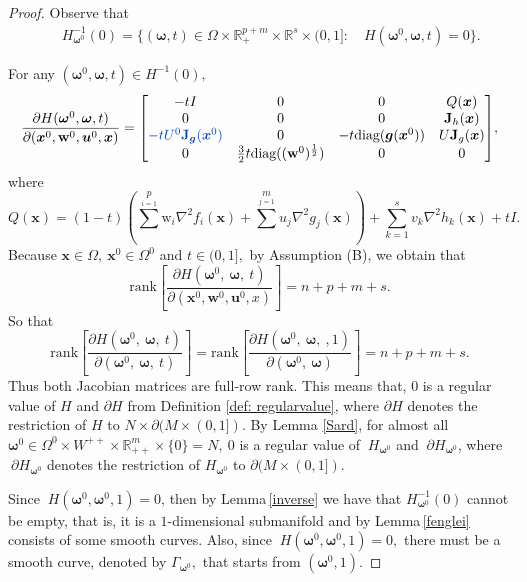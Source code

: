 \documentclass[11pt,pdflatex,sn-mathphys-ay]{sn-jnl}%
\theoremstyle{definition}
\theoremstyle{thmstyleone}%
\theoremstyle{thmstyletwo}%
\theoremstyle{thmstylethree}%
\newcommand{\add}[1]{\textcolor{revisionblue}{#1}}
\begin{document}
	\begin{proof}
		Observe that \begin{eqnarray*}
			&& H^{-1}_{\bm{\omega}^0}(0)  =  \{(\bm{\omega},t) \in \Omega \times
			\mathbb{R}^{p+m}_{+} \times \mathbb{R}^s \times (0, 1] \colon \quad H(\bm{\omega}^0, \bm{\omega},t) = 0\}.
		\end{eqnarray*}
		
		For any $ (\bm{\omega}^0, \bm{\omega},  t)\in H^{-1}(0),$
		$$\frac{\partial H( \bm{\omega}^0, \bm{\omega}, t)}{\partial(\bm{x}^0, \textbf{w}^0, \bm{u}^0, \bm{x})}=
		\begin{matrix}
			\begin{bmatrix}
				-t I & 0 & 0 & Q(\bm{x}) \\
				0 & 0 & 0 & \textbf{J}_ h(\bm{x})\\
				\add{-t U^0\textbf{J}_{\bm{g}}(\bm{x}^0)}
				& 0 & -t \text{diag} (\bm{g}(\bm{x}^0)) & U \textbf{J}_ g(\bm{x})\\
				0 & \frac{3}{2}t \text{diag}((\textbf{w}^0)^{\frac{1}{2}}) & 0 & 0 
			\end{bmatrix}
		\end{matrix},$$
		where 
		\[Q(\bm{x})=(1-t)(\sum^p\limits_{i=1}\text{w}_i\nabla^2f_i(\bm{x})
		+\sum^m\limits_{j=1}u_j\nabla^2g_j(\bm{x}))+\sum\limits_{k=1}^sv_k\nabla
		^2 h_k(\bm{x})+t I.\]
		Because $\bm{x}\in \Omega, ~ \bm{x}^0 \in \Omega^0 $ and $t\in (0, 1],$ by Assumption (B), we obtain that 
		\[
		\text{rank}\left[\frac{\partial
			H(\bm{\omega}^0, ~\bm{\omega}, ~t)}{\partial(\bm{x}^0, \textbf{w}^0,
			\bm{u}^0, x)}\right]=n+p+m+s.
		\]
		So that 
		\[\text{rank}\left[\frac{\partial
			H(\bm{\omega}^0, ~\bm{\omega}, ~t)}{\partial(\bm{\omega}^0, ~\bm{\omega}, ~ t)}\right] = \text{rank}\left[\frac{\partial
			H(\bm{\omega}^0, ~\bm{\omega},~ , 1)}{\partial(\bm{\omega}^0, ~\bm{\omega})}\right]=n+p+m+s.
		\]
		Thus both Jacobian matrices are full-row rank. This means that, $0$ is a regular value of $H$ and
		$\partial H$ from Definition \ref{def: regularvalue}, where $\partial H$ denotes the restriction of $H$ to $N \times \partial (M \times (0,1]).$ By Lemma \ref{Sard}, for almost all $\bm{\omega}^0 \in
		\Omega^0\times W^{++}\times
		\mathbb{R}^{m}_{++}\times\{0\}=N, ~0$ is a regular value of $~H_{\bm{\omega}^0}$ and $~\partial H_{\bm{\omega}^0}$, where $~\partial H_{\bm{\omega}^0}$ denotes the restriction of $H_{\bm{\omega}^0}$ to $\partial (M \times (0,1]).$
		
		\noindent Since $~H(\bm{\omega}^0, \bm{\omega}^0, 1)=0$, then by Lemma\,\ref{inverse} we have that $H_{\bm{\omega}^0}^{-1}(0)$ cannot be empty, that is, it is a $1$-dimensional submanifold and by Lemma\,\ref{fenglei} consists of
		some smooth curves. Also, since $~H(\bm{\omega}^0, \bm{\omega}^0,
		1)=0,$ there must be a smooth curve,  denoted by $\Gamma_{\bm{\omega}^0},$ that starts from $(\bm{\omega}^0, 1) $.
	\end{proof}
	
\end{document}

